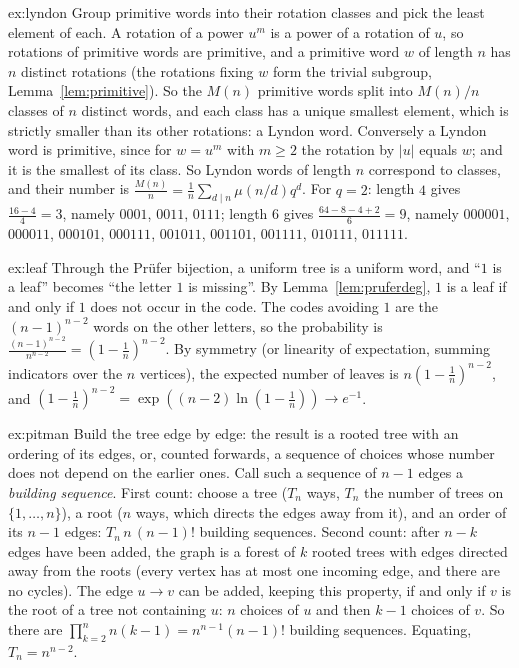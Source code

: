 \begin{solution}{ex:lyndon}
\idea Group primitive words into their rotation classes and pick the least element of each.
\writeup A rotation of a power $u^m$ is a power of a rotation of $u$, so rotations of primitive words are primitive, and a primitive
word $w$ of length $n$ has $n$ distinct rotations (the rotations fixing $w$ form the trivial subgroup, Lemma~\ref{lem:primitive}). So the
$M(n)$ primitive words split into $M(n)/n$ classes of $n$ distinct words, and each class has a unique smallest element, which is
strictly smaller than its other rotations: a Lyndon word. Conversely a Lyndon word is primitive, since for $w=u^m$ with $m\ge2$ the
rotation by $|u|$ equals $w$; and it is the smallest of its class. So Lyndon words of length $n$ correspond to classes, and their number
is $\frac{M(n)}n=\frac1n\sum_{d\mid n}\mu(n/d)q^d$. For $q=2$: length $4$ gives $\frac{16-4}4=3$, namely $0001$, $0011$, $0111$; length $6$ gives $\frac{64-8-4+2}6=9$, namely
$000001$, $000011$, $000101$, $000111$, $001011$, $001101$, $001111$, $010111$, $011111$.
\end{solution}

\begin{solution}{ex:leaf}
\idea Through the Pr\"ufer bijection, a uniform tree is a uniform word, and ``$1$ is a leaf'' becomes ``the letter $1$ is missing''.
\writeup By Lemma~\ref{lem:pruferdeg}, $1$ is a leaf if and only if $1$ does not occur in the code. The codes avoiding $1$ are the $(n-1)^{n-2}$ words
on the other letters, so the probability is $\frac{(n-1)^{n-2}}{n^{n-2}}=(1-\frac1n)^{n-2}$. By symmetry (or linearity of expectation, summing
indicators over the $n$ vertices), the expected number of leaves is $n(1-\frac1n)^{n-2}$, and $(1-\frac1n)^{n-2}=\exp((n-2)\ln(1-\frac1n))\to e^{-1}$.
\end{solution}

\begin{solution}{ex:pitman}
\idea Build the tree edge by edge: the result is a rooted tree with an ordering of its edges, or, counted forwards, a sequence
of choices whose number does not depend on the earlier ones.
\writeup Call such a sequence of $n-1$ edges a \emph{building sequence}. First count: choose a tree ($T_n$ ways, $T_n$ the number of trees on
$\{1,\dots,n\}$), a root ($n$ ways, which directs the edges away from it), and an order of its $n-1$ edges: $T_n\,n\,(n-1)!$ building sequences.
Second count: after $n-k$ edges have been added, the graph is a forest of $k$ rooted trees with edges directed away from the roots
(every vertex has at most one incoming edge, and there are no cycles). The edge $u\to v$ can be added, keeping this property, if and
only if $v$ is the root of a tree not containing $u$: $n$ choices of $u$ and then $k-1$ choices of $v$. So there are $\prod_{k=2}^nn(k-1)=n^{n-1}(n-1)!$
building sequences. Equating, $T_n=n^{n-2}$.
\end{solution}

